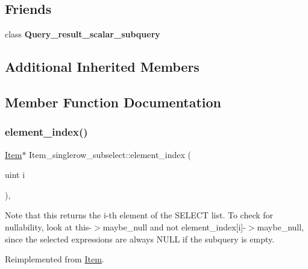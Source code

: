 \subsection*{Friends}
\begin{DoxyCompactItemize}
\item 
\mbox{\label{classItem__singlerow__subselect_a3b7aea52faa841d6b69d4ce99bd01c3f}} 
class {\bfseries Query\+\_\+result\+\_\+scalar\+\_\+subquery}
\end{DoxyCompactItemize}
\subsection*{Additional Inherited Members}


\subsection{Member Function Documentation}
\mbox{\label{classItem__singlerow__subselect_a3ff3e0ac48f187f1a53b54fd0e533b40}} 
\subsubsection{\texorpdfstring{element\+\_\+index()}{element\_index()}}
{\footnotesize\ttfamily \mbox{\hyperlink{classItem}{Item}}$\ast$ Item\+\_\+singlerow\+\_\+subselect\+::element\+\_\+index (\begin{DoxyParamCaption}\item[{uint}]{i }\end{DoxyParamCaption})\hspace{0.3cm}{\ttfamily [inline]}, {\ttfamily [virtual]}}

\begin{DoxyNote}{Note}
that this returns the i-\/th element of the S\+E\+L\+E\+CT list. To check for nullability, look at this-\/$>$maybe\+\_\+null and not element\+\_\+index\mbox{[}i\mbox{]}-\/$>$maybe\+\_\+null, since the selected expressions are always N\+U\+LL if the subquery is empty. 
\end{DoxyNote}


Reimplemented from \mbox{\hyperlink{classItem}{Item}}.

